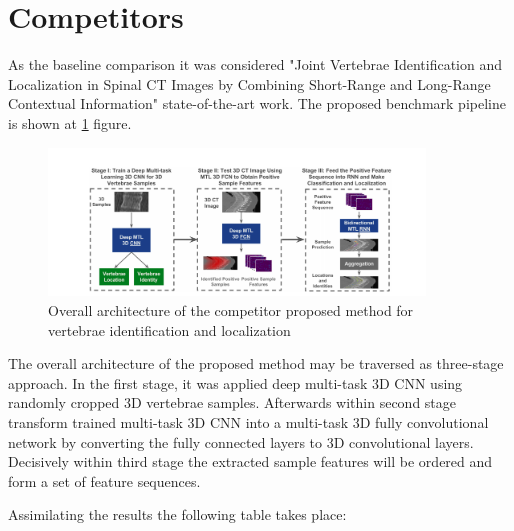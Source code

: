 \section{Competitors}
As the baseline comparison it was considered \cite{Liao2018} "Joint Vertebrae Identification and Localization in Spinal CT Images by Combining Short-Range and Long-Range Contextual Information" state-of-the-art work. The proposed benchmark pipeline is shown at \ref{fig:competitor} figure.

\begin{figure}[h]
    \centering \includegraphics[width=10cm]{images/competitor.png}
    \caption {Overall architecture of the competitor proposed method for vertebrae identification and localization}
    \label{fig:competitor}
\end{figure}

The overall architecture of the proposed method may be traversed as three-stage approach. In the first stage, it was applied deep multi-task 3D CNN using randomly cropped 3D vertebrae samples. Afterwards within second stage transform trained multi-task 3D CNN into a multi-task 3D fully convolutional network by converting the fully connected layers to 3D convolutional layers. Decisively within third stage the extracted sample features will be ordered and form a set of feature sequences.


Assimilating the results the following table takes place:
